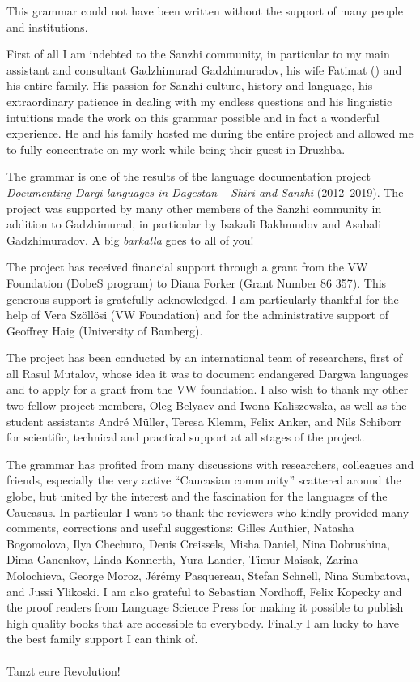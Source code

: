

This grammar could not have been written without the support of many people and institutions.

First of all I am indebted to the Sanzhi community, in particular to my main assistant and consultant Gadzhimurad Gadzhimuradov, his wife Fatimat () and his entire family. His passion for Sanzhi culture, history and language, his extraordinary patience in dealing with my endless questions and his linguistic intuitions made the work on this grammar possible and in fact a wonderful experience. He and his family hosted me during the entire project and allowed me to fully concentrate on my work while being their guest in Druzhba.

The grammar is one of the results of the language documentation project \textit{Documenting Dargi languages in Dagestan -- Shiri and Sanzhi} (2012--2019). The project was supported by many other members of the Sanzhi community in addition to Gadzhimurad, in particular by Isakadi Bakhmudov and Asabali Gadzhimuradov. A big \textit{barkalla} goes to all of you!

The project has received financial support through a grant from the VW Foundation (DobeS program) to Diana Forker (Grant Number 86 357). This generous support is gratefully acknowledged. I am particularly thankful for the help of Vera Szöllösi (VW Foundation) and for the administrative support of Geoffrey Haig (University of Bamberg).

The project has been conducted by an international team of researchers, first of all Rasul Mutalov, whose idea it was to document endangered Dargwa languages and to apply for a grant from the VW foundation. I also wish to thank my other two fellow project members, Oleg Belyaev and Iwona Kaliszewska, as well as the student assistants André Müller, Teresa Klemm, Felix Anker, and Nils Schiborr for scientific, technical and practical support at all stages of the project.

The grammar has profited from many discussions with researchers, colleagues and friends, especially the very active ``Caucasian community'' scattered around the globe, but united by the interest and the fascination for the languages of the Caucasus. In particular I want to thank the reviewers who kindly provided many comments, corrections and useful suggestions: Gilles Authier, Natasha Bogomolova, Ilya Chechuro, Denis Creissels, Misha Daniel, Nina Dobrushina, Dima Ganenkov, Linda Konnerth, Yura Lander, Timur Maisak, Zarina Molochieva, George Moroz, Jérémy Pasquereau, Stefan Schnell, Nina Sumbatova, and Jussi Ylikoski. I am also grateful to Sebastian Nordhoff, Felix Kopecky and the proof readers from Language Science Press for making it possible to publish high quality books that are accessible to everybody. Finally I am lucky to have the best family support I can think of.
\\\\
Tanzt eure Revolution!



 



